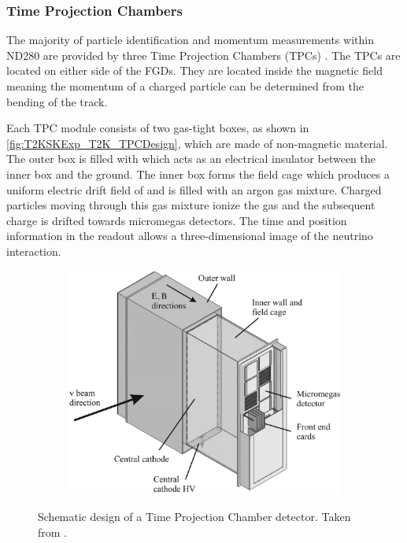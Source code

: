 \subsubsection{Time Projection Chambers}
\label{subsubsec:T2KSKExp_T2K_TPCs}

The majority of particle identification and momentum measurements within ND280 are provided by three Time Projection Chambers (TPCs) \cite{Abgrall2011}. The TPCs are located on either side of the FGDs. They are located inside the magnetic field meaning the momentum of a charged particle can be determined from the bending of the track.

Each TPC module consists of two gas-tight boxes, as shown in \autoref{fig:T2KSKExp_T2K_TPCDesign}, which are made of non-magnetic material. The outer box is filled with  which acts as an electrical insulator between the inner box and the ground. The inner box forms the field cage which produces a uniform electric drift field of  and is filled with an argon gas mixture. Charged particles moving through this gas mixture ionize the gas and the subsequent charge is drifted towards micromegas detectors. The time and position information in the readout allows a three-dimensional image of the neutrino interaction.

\begin{figure}[h]
  \begin{subfigure}[t]{0.55\textwidth}
    \includegraphics[width=\textwidth, trim={0mm 0mm 0mm 0mm}, clip,page=1]{Figures/Detectors/T2KTPCDesign.pdf}
  \end{subfigure}
  \caption{Schematic design of a Time Projection Chamber detector. Taken from \cite{Abgrall2011}.}
  \label{fig:T2KSKExp_T2K_TPCDesign}
\end{figure}

